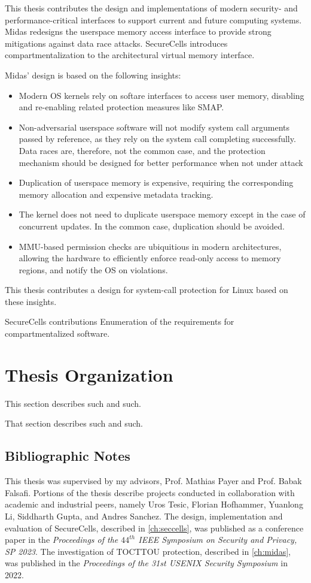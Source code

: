 This thesis contributes the design and implementations of modern
security- and performance-critical interfaces to support 
current and future computing systems.
Midas redesigns the userspace memory access interface to provide
strong mitigations against data race attacks.
SecureCells introduces compartmentalization to the architectural
virtual memory interface.

Midas' design is based on the following insights:
\begin{itemize}
  \item Modern OS kernels rely on softare interfaces to access
        user memory, disabling and re-enabling related
        protection measures like SMAP.
  \item Non-adversarial userspace software will not modify
        system call arguments passed by reference, as they
        rely on the system call completing successfully.
        Data races are, therefore, not the common case, and
        the protection mechanism should be designed for better
        performance when not under attack
  \item Duplication of userspace memory is expensive, requiring
        the corresponding memory allocation and expensive
        metadata tracking.
  \item The kernel does not need to duplicate userspace memory
        except in the case of concurrent updates. In the common
        case, duplication should be avoided.
  \item MMU-based permission checks are ubiquitious in modern
        architectures, allowing the hardware to efficiently
        enforce read-only access to memory regions, and
        notify the OS on violations.
\end{itemize}
This thesis contributes a design for system-call protection for Linux
based on these insights.

SecureCells contributions
Enumeration of the requirements for compartmentalized software.

\section{Thesis Organization}

This section describes such and such.

That section describes such and such.

\subsection{Bibliographic Notes}
This thesis was supervised by my advisors, Prof. Mathias Payer and Prof. Babak Falsafi.
Portions of the thesis describe projects conducted in collaboration with academic and
industrial peers, namely Uros Tesic, Florian Hofhammer, Yuanlong Li, Siddharth Gupta, 
and Andres Sanchez.
The design, implementation and evaluation of SecureCells, described in 
\autoref{ch:seccells}, was published as a conference paper in the 
\emph{Proceedings of the $44^{th}$ IEEE Symposium on Security and Privacy, SP 2023}.
The investigation of TOCTTOU protection, described in \autoref{ch:midas},
was published in the
\emph{Proceedings of the 31st USENIX Security Symposium} in 2022.

